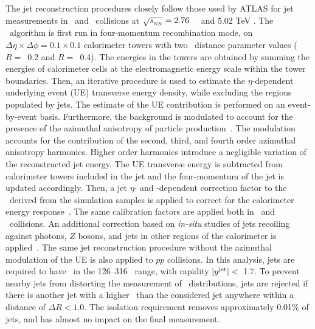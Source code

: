 
The jet reconstruction procedures closely follow those used by \mbox{ATLAS} for jet measurements in \pp\ and \PbPb\ collisions at
$\mbox{$\sqrt{s_{_\text{NN}}}$}=2.76$~\TeV~\cite{Aad:2014bxa} and 5.02 TeV \cite{2019108}.
The \antikt\ algorithm is first run in four-momentum recombination mode, on
$\Delta \eta \times \Delta \phi = 0.1\times 0.1$  calorimeter towers with two \antikt\ distance parameter values ($R=$~0.2 and $R=$~0.4). The energies in the towers are obtained by summing the
	energies of calorimeter cells at the electromagnetic energy scale within the tower boundaries. Then,
	  an iterative procedure is used to estimate the $\eta$-dependent underlying event (UE)  transverse energy density, while excluding the regions populated by jets. The estimate of the UE contribution is performed on an event-by-event basis.
	Furthermore, the background is modulated to account for the presence of the azimuthal anisotropy of particle production~\cite{ATLAS:2012at}. The modulation accounts for the contribution of the second, third, and fourth order azimuthal anisotropy harmonics.
	Higher order harmonics introduce a negligible variation of the reconstructed jet energy.
	The UE transverse energy is subtracted from calorimeter towers included in the jet and the four-momentum of the jet is updated accordingly.
	  Then, a jet $\eta$- and \pT-dependent  correction factor to the \ptjet\ 
	  derived from the simulation samples is applied to correct for the calorimeter energy
	  response~\cite{Aaboud:2017jcu}. The same calibration factors are applied both 
in \pp\ and \pbpb\ collisions.
An additional correction based on \textit{in-situ} studies of jets recoiling against photons, $Z$ bosons, and jets in other regions of the calorimeter is
	  applied~\cite{ATL-PHYS-PUB-2015-036,2019167}. The same jet reconstruction procedure without the
	  azimuthal modulation of the UE is also applied to $pp$ collisions.
	  In this analysis, jets are required to have \ptjet\ in the 126--316 \GeV\ range, with rapidity  $|\mbox{$y^{\mathrm{jet}}$}|<$~1.7. 
 To prevent nearby jets from distorting the measurement of \Dptr\ distributions, 
jets are rejected if there is another jet with a higher \ptjet\ than the considered jet anywhere
within a distance of $\Delta R < 1.0$. The isolation requirement removes approximately 0.01\% of jets, and has almost no impact on the final measurement.

